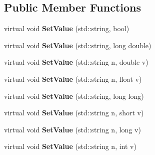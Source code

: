 \subsection*{Public Member Functions}
\begin{DoxyCompactItemize}
\item 
\hypertarget{class_h_a_l_1_1_analysis_data_afca3f0d036da06f1a450d0e7289089f0}{virtual void {\bfseries Set\-Value} (std\-::string, bool)}\label{class_h_a_l_1_1_analysis_data_afca3f0d036da06f1a450d0e7289089f0}

\item 
\hypertarget{class_h_a_l_1_1_analysis_data_a6154ef23ef8e1fcd4f61c4ce25267aad}{virtual void {\bfseries Set\-Value} (std\-::string, long double)}\label{class_h_a_l_1_1_analysis_data_a6154ef23ef8e1fcd4f61c4ce25267aad}

\item 
\hypertarget{class_h_a_l_1_1_analysis_data_a9354f0397d9d472c74d07d1487e06617}{virtual void {\bfseries Set\-Value} (std\-::string n, double v)}\label{class_h_a_l_1_1_analysis_data_a9354f0397d9d472c74d07d1487e06617}

\item 
\hypertarget{class_h_a_l_1_1_analysis_data_ae18ffa1d03d968e11cfa3a141aa9fb0d}{virtual void {\bfseries Set\-Value} (std\-::string n, float v)}\label{class_h_a_l_1_1_analysis_data_ae18ffa1d03d968e11cfa3a141aa9fb0d}

\item 
\hypertarget{class_h_a_l_1_1_analysis_data_af5c5591f0f0933d33a7f7ea808fbcee0}{virtual void {\bfseries Set\-Value} (std\-::string, long long)}\label{class_h_a_l_1_1_analysis_data_af5c5591f0f0933d33a7f7ea808fbcee0}

\item 
\hypertarget{class_h_a_l_1_1_analysis_data_ab18cc5dc649ea982239d65e3ef38bf04}{virtual void {\bfseries Set\-Value} (std\-::string n, short v)}\label{class_h_a_l_1_1_analysis_data_ab18cc5dc649ea982239d65e3ef38bf04}

\item 
\hypertarget{class_h_a_l_1_1_analysis_data_ad4e3be50ca59ca0e7e56486c68f742c0}{virtual void {\bfseries Set\-Value} (std\-::string n, long v)}\label{class_h_a_l_1_1_analysis_data_ad4e3be50ca59ca0e7e56486c68f742c0}

\item 
\hypertarget{class_h_a_l_1_1_analysis_data_a3251ae47bdc4fc6808c65c88859de824}{virtual void {\bfseries Set\-Value} (std\-::string n, int v)}\label{class_h_a_l_1_1_analysis_data_a3251ae47bdc4fc6808c65c88859de824}


\end{DoxyCompactItemize}

